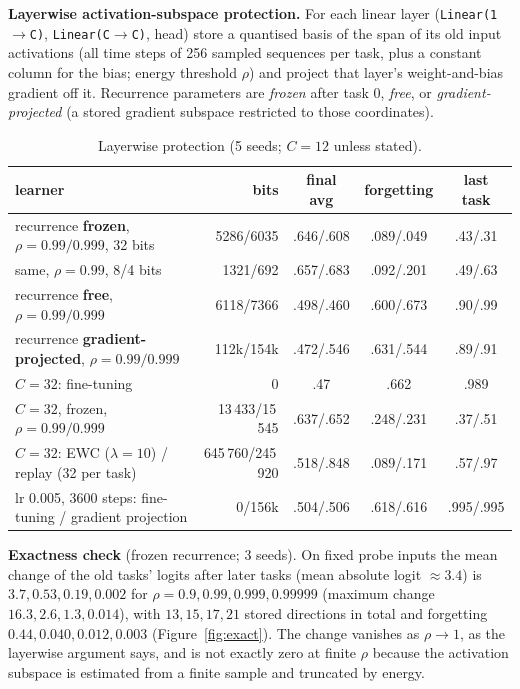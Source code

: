 \textbf{Layerwise activation-subspace protection.} For each linear layer (\texttt{Linear(1$\to$C)}, \texttt{Linear(C$\to$C)}, head) store a quantised basis of the span of its old input activations (all time steps of 256 sampled sequences per task, plus a constant column for the bias; energy threshold $\rho$) and project that layer's weight-and-bias gradient off it. Recurrence parameters are \emph{frozen} after task 0, \emph{free}, or \emph{gradient-projected} (a stored gradient subspace restricted to those coordinates).
\begin{table}[!htbp]
  \caption{Layerwise protection (5 seeds; $C=12$ unless stated).}
  \centering\scriptsize\setlength{\tabcolsep}{3.5pt}
  \begin{tabular}{>{\raggedright\arraybackslash}p{5.6cm}rccc}
    \toprule
    learner & bits & final avg & forgetting & last task \\
    \midrule
    recurrence \textbf{frozen}, $\rho=0.99/0.999$, 32 bits & 5286/6035 & .646/.608 & .089/.049 & .43/.31 \\
    same, $\rho=0.99$, 8/4 bits & 1321/692 & .657/.683 & .092/.201 & .49/.63 \\
    recurrence \textbf{free}, $\rho=0.99/0.999$ & 6118/7366 & .498/.460 & .600/.673 & .90/.99 \\
    recurrence \textbf{gradient-projected}, $\rho=0.99/0.999$ & 112k/154k & .472/.546 & .631/.544 & .89/.91 \\
    $C=32$: fine-tuning & 0 & .47 & .662 & .989 \\
    $C=32$, frozen, $\rho=0.99/0.999$ & 13\,433/15\,545 & .637/.652 & .248/.231 & .37/.51 \\
    $C=32$: EWC ($\lambda=10$) / replay (32 per task) & 645\,760/245\,920 & .518/.848 & .089/.171 & .57/.97 \\
    lr 0.005, 3600 steps: fine-tuning / gradient projection & 0/156k & .504/.506 & .618/.616 & .995/.995 \\
    \bottomrule
  \end{tabular}
\end{table}
\textbf{Exactness check} (frozen recurrence; 3 seeds). On fixed probe inputs the mean change of the old tasks' logits after later tasks (mean absolute logit $\approx3.4$) is $3.7,0.53,0.19,0.002$ for $\rho=0.9,0.99,0.999,0.99999$ (maximum change $16.3,2.6,1.3,0.014$), with $13,15,17,21$ stored directions in total and forgetting $0.44,0.040,0.012,0.003$ (Figure~\ref{fig:exact}). The change vanishes as $\rho\to1$, as the layerwise argument says, and is not exactly zero at finite $\rho$ because the activation subspace is estimated from a finite sample and truncated by energy.

